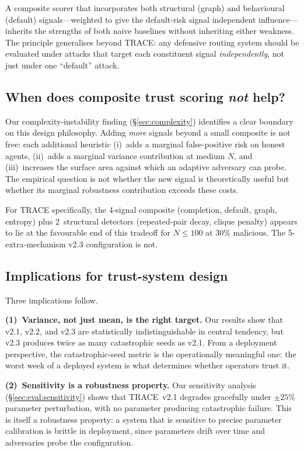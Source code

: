 \documentclass[sigconf,nonacm,10pt]{acmart}
\begin{document}
A composite scorer that incorporates both structural (graph) and
behavioural (default) signals---weighted to give the default-risk
signal independent influence---inherits the strengths of both
naive baselines without inheriting either weakness. The principle
generalises beyond TRACE: any defensive routing system should be
evaluated under attacks that target each constituent signal
\emph{independently}, not just under one ``default'' attack.

\subsection{When does composite trust scoring \emph{not} help?}

Our complexity-instability finding (\S\ref{sec:complexity})
identifies a clear boundary on this design philosophy. Adding
\emph{more} signals beyond a small composite is not free: each
additional heuristic (i)~adds a marginal false-positive risk on
honest agents, (ii)~adds a marginal variance contribution at
medium $N$, and (iii)~increases the surface area against which an
adaptive adversary can probe. The empirical question is not
whether the new signal is theoretically useful but whether its
marginal robustness contribution exceeds these costs.

For TRACE specifically, the 4-signal composite (completion,
default, graph, entropy) plus 2~structural detectors
(repeated-pair decay, clique penalty) appears to lie at the
favourable end of this tradeoff for $N \le 100$ at 30\% malicious.
The 5-extra-mechanism v2.3 configuration is not.

\subsection{Implications for trust-system design}

Three implications follow.

\noindent\textbf{(1)~Variance, not just mean, is the right
target.}
Our results show that v2.1, v2.2, and v2.3 are statistically
indistinguishable in central tendency, but v2.3 produces twice as
many catastrophic seeds as v2.1. From a deployment perspective,
the catastrophic-seed metric is the operationally meaningful one:
the worst week of a deployed system is what determines whether
operators trust it.

\noindent\textbf{(2)~Sensitivity is a robustness property.}
Our sensitivity analysis (\S\ref{sec:eval:sensitivity}) shows
that TRACE~v2.1 degrades gracefully under $\pm 25\%$ parameter
perturbation, with no parameter producing catastrophic failure.
This is itself a robustness property: a system that is sensitive
to precise parameter calibration is brittle in deployment, since
parameters drift over time and adversaries probe the configuration.
\end{document}
